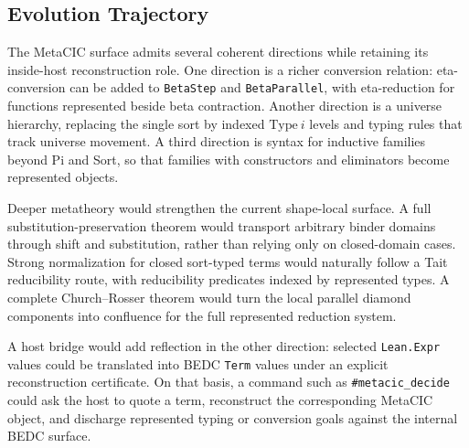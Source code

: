 \subsection{Evolution Trajectory}\label{subsec:reconstruction-evolution-trajectory}

The MetaCIC surface admits several coherent directions while retaining its
inside-host reconstruction role. One direction is a richer conversion relation:
eta-conversion can be added to \texttt{BetaStep} and
\texttt{BetaParallel}, with eta-reduction for functions represented beside
beta contraction. Another direction is a universe hierarchy, replacing the
single sort by indexed $\mathrm{Type}\ i$ levels and typing rules that track
universe movement. A third direction is syntax for inductive families beyond
Pi and Sort, so that families with constructors and eliminators become
represented objects.

Deeper metatheory would strengthen the current shape-local surface. A full
substitution-preservation theorem would transport arbitrary binder domains
through shift and substitution, rather than relying only on closed-domain
cases. Strong normalization for closed sort-typed terms would naturally follow
a Tait reducibility route, with reducibility predicates indexed by represented
types. A complete Church--Rosser theorem would turn the local parallel
diamond components into confluence for the full represented reduction system.

A host bridge would add reflection in the other direction: selected
\texttt{Lean.Expr} values could be translated into BEDC \texttt{Term} values
under an explicit reconstruction certificate. On that basis, a command such
as \texttt{\#metacic\_decide} could ask the host to quote a term, reconstruct
the corresponding MetaCIC object, and discharge represented typing or
conversion goals against the internal BEDC surface.
